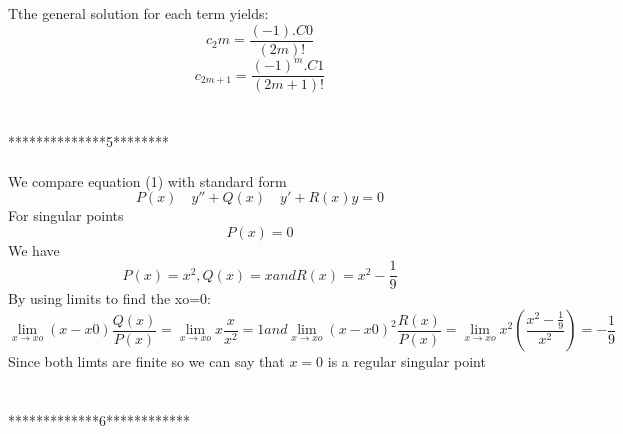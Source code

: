 \documentclass[onecolumn]{IEEEtran}
\begin{document}
    Tthe general solution for each term yields: 
        \begin{equation}
      c_2m=\frac{(-1).C0}{(2m)!}
    \end{equation}
    \begin{equation}
      c_{2m+1}=\frac{(-1)^m.C1}{(2m+1)!}
    \end{equation}
    \\
    \\
    **************5********
    \\
    \\
We compare equation (1) with standard form
    \begin{equation}
        P(x)\quad y''+Q(x)\quad y' + R(x)y=0
    \end{equation}
    For singular points
      \begin{equation}
        P(x)=0
    \end{equation}
We have
 \begin{equation}
        P(x)=x^{2},Q(x)=x and R(x)=x^{2}-\frac{1}{9}
    \end{equation}
    By using limits to find the xo=0:
    \begin{equation}
       \lim_{x\to xo}(x-x0)\frac{Q(x)}{P(x)}=\lim_{x\to xo}x\frac{x}{x^2}=1
       and \lim_{x\to xo}(x-x0)^{2}\frac{R(x)}{P(x)}=  \lim_{x\to xo}x^2(\frac{x^2-\frac{1}{9}}{x^2})=-\frac{1}{9}
       \label{lim}
    \end{equation}
 Since both limts are finite so we can say
 that $x = 0$ is a regular singular point
\\
\\
\\
*************6************
\\
\\
\\
\end{document}
